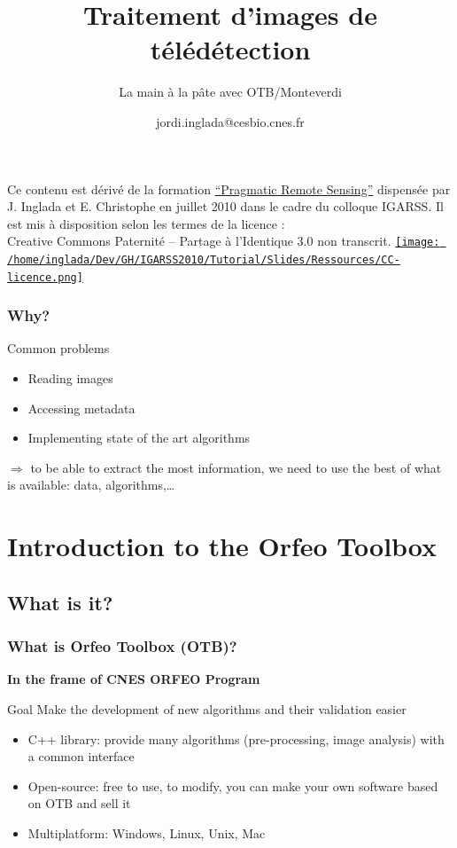 \documentclass[compress]{beamer}
\title{Traitement d'images de télédétection}
\subtitle{La main à la pâte avec OTB/Monteverdi} %
\author
{jordi.inglada@cesbio.cnes.fr}
\institute[Cesbio] %
{\textsc{Centre d'Études Spatiales de la Biosphère, Toulouse, France}}
\date{}
\begin{document}
\begin{frame}
  \titlepage
  \begin{center}
{\tiny Ce contenu est dérivé de la formation \href{http://www.orfeo-toolbox.org/packages/PragmaticRemoteSensing-handout.pdf}{``Pragmatic Remote
  Sensing''} dispensée par J. Inglada et E. Christophe en juillet 2010
  dans le cadre du colloque IGARSS. Il est mis à disposition selon les termes de la licence :\\
Creative Commons Paternité – Partage à l’Identique 3.0 non transcrit.} \href{http://creativecommons.org/licenses/by-sa/3.0/}{\texttt{[image: /home/inglada/Dev/GH/IGARSS2010/Tutorial/Slides/Ressources/CC-licence.png]}}    
  \end{center}

\end{frame}

\begin{frame}
\frametitle{Why?}
\begin{block}{Common problems}
\begin{itemize}
 \item Reading images
 \item Accessing metadata
 \item Implementing state of the art algorithms
\end{itemize}
\end{block}
$\Rightarrow$ to be able to \alert{extract the most information}, we
 need to \alert{use the best} of what is available: data, algorithms,\ldots
\end{frame}


\section{Introduction to the Orfeo Toolbox}



\subsection[What]{What is it?}
\begin{frame}
\frametitle{What is Orfeo Toolbox (OTB)?}

\textbf{In the frame of CNES ORFEO Program}
\begin{alertblock}{Goal}
Make the development of new algorithms and their validation easier
\end{alertblock}
\begin{block}{}
\begin{itemize}
 \item C++ library: provide many algorithms (pre-processing, image analysis) with a common interface
 \item Open-source: free to use, to modify, you can make your own software based on OTB and sell it
 \item Multiplatform: Windows, Linux, Unix, Mac
\end{itemize}
\end{block}
\end{frame}
\end{document}
